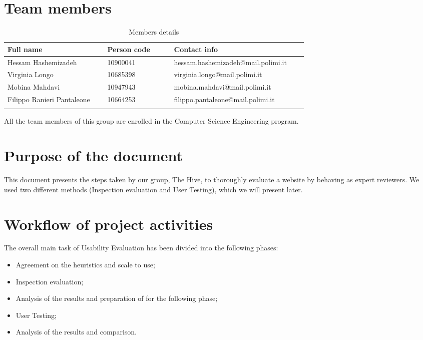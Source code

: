 \section{Team members}
\begin{longtable}
    {|m{0.3\linewidth}|m{0.2\linewidth}|m{0.4\linewidth}|}
            \hline
            \textbf{Full name} & \textbf{Person code} & \textbf{Contact info}\\
            \hline
            \endhead
                Hessam Hashemizadeh & 10900041 & hessam.hashemizadeh@mail.polimi.it \\
            \hline
                Virginia Longo & 10685398 & virginia.longo@mail.polimi.it \\
            \hline
                Mobina Mahdavi & 10947943 & mobina.mahdavi@mail.polimi.it \\
            \hline
                Filippo Ranieri Pantaleone & 10664253 & filippo.pantaleone@mail.polimi.it \\
            \hline
            \caption{Members details}
            \label{table:mem_details}
\end{longtable}

All the team members of this group are enrolled in the Computer Science Engineering program.

\section{Purpose of the document}
This document presents the steps taken by our group, The Hive, to thoroughly evaluate a website by behaving as expert reviewers. We used two different methods (Inspection evaluation and User Testing), which we will present later.

\pagebreak

\section{Workflow of project activities}
The overall main task of Usability Evaluation has been divided into the following phases:

\begin{itemize}
	\item Agreement on the heuristics and scale to use;
	\item Inspection evaluation;
	\item Analysis of the results and preparation of for the following phase;
	\item User Testing;
	\item Analysis of the results and comparison.
\end{itemize}

